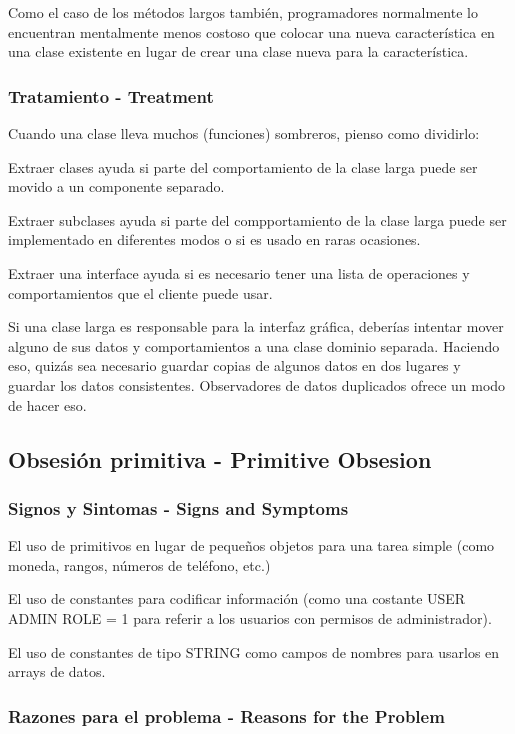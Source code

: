 \documentclass[11pt,a4paper,oneside]{book}
\begin{document}
Como el caso de los métodos largos también, programadores normalmente lo encuentran mentalmente menos costoso que colocar una nueva característica en una clase existente en lugar de crear una clase nueva para la característica. 

\subsubsection{Tratamiento - Treatment}

Cuando una clase lleva muchos (funciones) sombreros, pienso como dividirlo: 

Extraer clases ayuda si parte del comportamiento de la clase larga puede ser movido a un componente separado. 

Extraer subclases ayuda si parte del compportamiento de la clase larga puede ser implementado en diferentes modos o si es usado en raras ocasiones.

Extraer una interface ayuda si es necesario tener una lista de operaciones y comportamientos que el cliente puede usar.

Si una clase larga es responsable para la interfaz gráfica, deberías intentar mover alguno de sus datos y comportamientos a una clase dominio separada. Haciendo eso, quizás sea necesario guardar copias de algunos datos en dos lugares y guardar los datos consistentes. Observadores de datos duplicados ofrece un modo de hacer eso. 




\subsection{Obsesión primitiva - Primitive Obsesion}
\label{primitiveobsesion}
\subsubsection{Signos y Sintomas - Signs and Symptoms}
El uso de primitivos en lugar de pequeños objetos para una tarea simple (como moneda, rangos, números de teléfono, etc.)

El uso de constantes para codificar información (como una costante USER ADMIN ROLE = 1 para referir a los usuarios con permisos de administrador).

El uso de constantes de tipo STRING como campos de nombres para usarlos en arrays de datos. 




\subsubsection{Razones para el problema - Reasons for the Problem}
\end{document}
